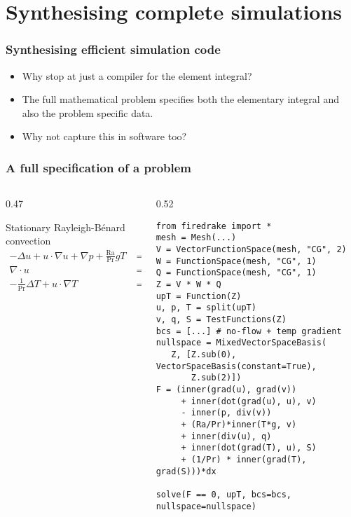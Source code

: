 \documentclass[presentation]{beamer}
\begin{document}
\section{Synthesising complete simulations}

\begin{frame}
  \frametitle{Synthesising efficient simulation code}
  \begin{itemize}
  \item Why stop at just a compiler for the element integral?
  \item The full mathematical problem specifies both the elementary
    integral and also the problem specific data.
  \item Why not capture this in software too?
  \end{itemize}
\end{frame}

\begin{frame}[fragile]
  \frametitle{A full specification of a problem}
  \begin{columns}
    \begin{column}{0.47\framewidth}
      \begin{block}{Stationary Rayleigh-B\'enard convection}
        \begin{equation*}
          \begin{split}
            -\Delta u + u\cdot\nabla u + \nabla p +
            \frac{\text{Ra}}{\text{Pr}} \hat{g}T &= 0 \\
            \nabla \cdot u &= 0 \\
            - \frac{1}{\text{Pr}} \Delta T + u\cdot \nabla T &= 0
          \end{split}
        \end{equation*}
      \end{block}
    \end{column}
    \begin{column}{0.52\framewidth}
\begin{verbatim}
from firedrake import *
mesh = Mesh(...)
V = VectorFunctionSpace(mesh, "CG", 2)
W = FunctionSpace(mesh, "CG", 1)
Q = FunctionSpace(mesh, "CG", 1)
Z = V * W * Q
upT = Function(Z)
u, p, T = split(upT)
v, q, S = TestFunctions(Z)
bcs = [...] # no-flow + temp gradient
nullspace = MixedVectorSpaceBasis(
   Z, [Z.sub(0), VectorSpaceBasis(constant=True), 
       Z.sub(2)])
F = (inner(grad(u), grad(v))
     + inner(dot(grad(u), u), v)
     - inner(p, div(v))
     + (Ra/Pr)*inner(T*g, v)
     + inner(div(u), q)
     + inner(dot(grad(T), u), S)
     + (1/Pr) * inner(grad(T), grad(S)))*dx

solve(F == 0, upT, bcs=bcs, nullspace=nullspace)
\end{verbatim}
    \end{column}
  \end{columns}
\end{frame}
\end{document}
